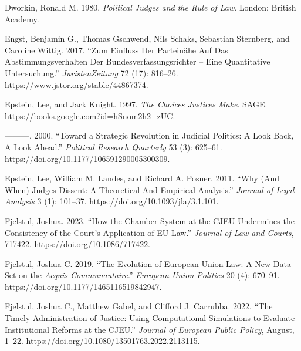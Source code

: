 \documentclass[
  11pt,
]{article}
\newlength{\cslhangindent}
\newenvironment{CSLReferences}[2] %
 {%
  \setlength{\parindent}{0pt}
  \ifodd #1 \everypar{\setlength{\hangindent}{\cslhangindent}}\ignorespaces\fi
  \ifnum #2 > 0
  \setlength{\parskip}{#2\baselineskip}
  \fi
 }%
 {}
\begin{document}
\begin{CSLReferences}{1}{0}
\leavevmode{}%
Dworkin, Ronald M. 1980. \emph{Political Judges and the Rule of Law}.
{London}: {British Academy}.

\leavevmode{}%
Engst, Benjamin G., Thomas Gschwend, Nils Schaks, Sebastian Sternberg,
and Caroline Wittig. 2017. {``Zum {Einfluss} Der {Parteinähe} Auf Das
{Abstimmungsverhalten} Der {Bundesverfassungsrichter} -- Eine
Quantitative {Untersuchung}.''} \emph{JuristenZeitung} 72 (17): 816--26.
\url{https://www.jstor.org/stable/44867374}.

\leavevmode{}%
Epstein, Lee, and Jack Knight. 1997. \emph{The {Choices Justices Make}}.
{SAGE}. \url{https://books.google.com?id=hSnom2h2_zUC}.

\leavevmode{}%
---------. 2000. {``Toward a {Strategic Revolution} in {Judicial
Politics}: {A Look Back}, {A Look Ahead}.''} \emph{Political Research
Quarterly} 53 (3): 625--61.
\url{https://doi.org/10.1177/106591290005300309}.

\leavevmode{}%
Epstein, Lee, William M. Landes, and Richard A. Posner. 2011. {``Why
({And When}) {Judges Dissent}: {A Theoretical And Empirical
Analysis}.''} \emph{Journal of Legal Analysis} 3 (1): 101--37.
\url{https://doi.org/10.1093/jla/3.1.101}.

\leavevmode{}%
Fjelstul, Joshua. 2023. {``How the {Chamber System} at the {CJEU
Undermines} the {Consistency} of the {Court}'s {Application} of {EU
Law}.''} \emph{Journal of Law and Courts}, 717422.
\url{https://doi.org/10.1086/717422}.

\leavevmode{}%
Fjelstul, Joshua C. 2019. {``The Evolution of {European Union} Law: {A}
New Data Set on the {\emph{Acquis Communautaire}}.''} \emph{European
Union Politics} 20 (4): 670--91.
\url{https://doi.org/10.1177/1465116519842947}.

\leavevmode{}%
Fjelstul, Joshua C., Matthew Gabel, and Clifford J. Carrubba. 2022.
{``The Timely Administration of Justice: Using Computational Simulations
to Evaluate Institutional Reforms at the {CJEU}.''} \emph{Journal of
European Public Policy}, August, 1--22.
\url{https://doi.org/10.1080/13501763.2022.2113115}.


\end{CSLReferences}
\end{document}
